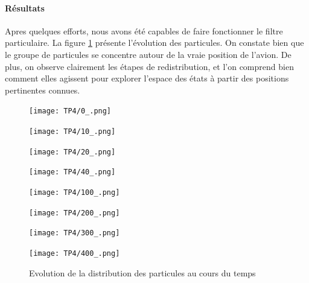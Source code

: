 \documentclass{article}
\begin{document}
 \paragraph{Résultats}
 Apres quelques efforts, nous avons été capables de faire fonctionner le 
 filtre particulaire. La figure \ref{navigation} présente l'évolution des
 particules. On constate bien que le groupe de particules se concentre autour de la 
 vraie position de l'avion. De plus, on observe clairement les étapes de redistribution,
 et l'on comprend bien comment elles agissent pour explorer l'espace des états à partir
 des positions pertinentes connues.
 

 \begin{figure}[h!]
   \centering
   \begin{minipage}[t]{5.5cm}
       \centering
       \texttt{[image: TP4/0\_.png]}
   \end{minipage}
   \begin{minipage}[t]{5.5cm}
       \centering
       \texttt{[image: TP4/10\_.png]}
   \end{minipage}
   \begin{minipage}[t]{5.5cm}
      \centering
      \texttt{[image: TP4/20\_.png]}
  \end{minipage}
  \begin{minipage}[t]{5.5cm}
   \centering
   \texttt{[image: TP4/40\_.png]}
\end{minipage}
\begin{minipage}[t]{5.5cm}
   \centering
   \texttt{[image: TP4/100\_.png]}
\end{minipage}
\begin{minipage}[t]{5.5cm}
   \centering
   \texttt{[image: TP4/200\_.png]}
\end{minipage}
\begin{minipage}[t]{5.5cm}
   \centering
   \texttt{[image: TP4/300\_.png]}
\end{minipage}
\begin{minipage}[t]{5.5cm}
   \centering
   \texttt{[image: TP4/400\_.png]}
\end{minipage}
\caption{Evolution de la distribution des particules au cours du temps}
\label{navigation}
\end{figure} 
\end{document}
